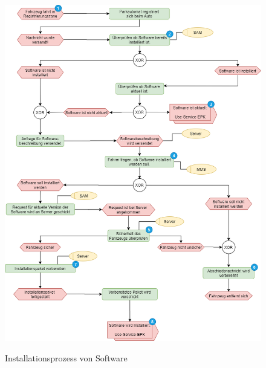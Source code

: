 \begin{figure}[!h]
	\hspace{-1cm}
	\includegraphics[width=1.1\columnwidth]{pictures/konzept-Installationsprozess.png}
	\label{img:installationsProtokollExtern}
	\caption{Installationsprozess von Software}
\end{figure}
